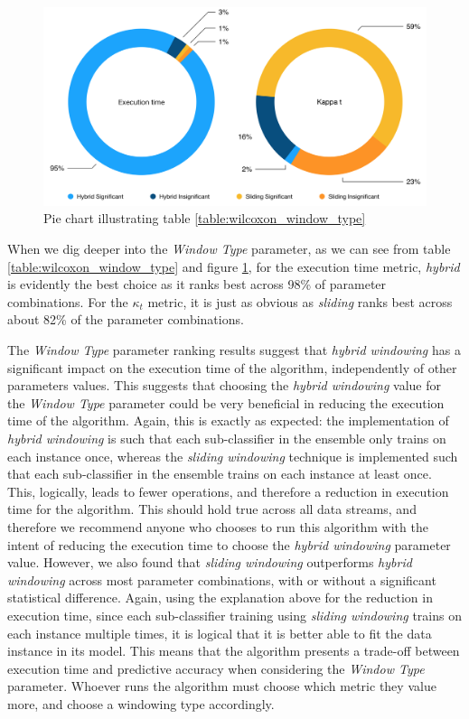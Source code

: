 \begin{figure}
  \includegraphics[width=\linewidth]{./images/chapter5/wilcoxon_window_type_pie}
\caption{\label{fig:wilcoxon_window_type_pie}Pie chart illustrating table \ref{table:wilcoxon_window_type}}
\end{figure}


When we dig deeper into the \textit{Window Type} parameter, as we can see from table \ref{table:wilcoxon_window_type}  and figure \ref{fig:wilcoxon_window_type_pie}, for the execution time metric, \textit{hybrid} is evidently the best choice as it ranks best across 98\% of parameter combinations. For the $\kappa_t$ metric, it is just as obvious as \textit{sliding} ranks best across about 82\% of the parameter combinations. 

The \textit{Window Type} parameter ranking results suggest that \textit{hybrid windowing} has a significant impact on the execution time of the algorithm, independently of other parameters values. This suggests that choosing the \textit{hybrid windowing} value for the \textit{Window Type} parameter could be very beneficial in reducing the execution time of the algorithm. Again, this is exactly as expected: the implementation of \textit{hybrid windowing} is such that each sub-classifier in the ensemble only trains on each instance once, whereas the \textit{sliding windowing} technique is implemented such that each sub-classifier in the ensemble trains on each instance at least once. This, logically, leads to fewer operations, and therefore a reduction in execution time for the algorithm. This should hold true across all data streams, and therefore we recommend anyone who chooses to run this algorithm with the intent of reducing the execution time to choose the \textit{hybrid windowing} parameter value.
However, we also found that \textit{sliding windowing} outperforms \textit{hybrid windowing} across most parameter combinations, with or without a significant statistical difference. Again, using the explanation above for the reduction in execution time, since each sub-classifier training using \textit{sliding windowing} trains on each instance multiple times, it is logical that it is better able to fit the data instance in its model. 
This means that the algorithm presents a trade-off between execution time and predictive accuracy when considering the \textit{Window Type} parameter. Whoever runs the algorithm must choose which metric they value more, and choose a windowing type accordingly.

